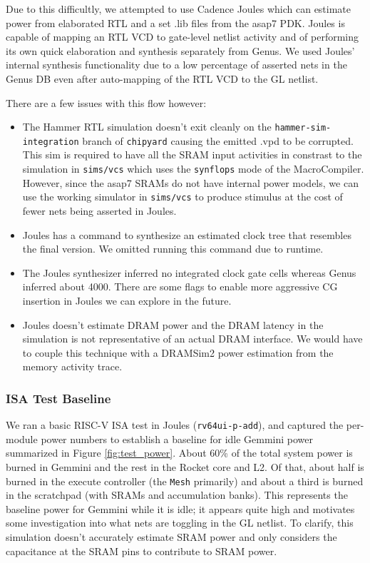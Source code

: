 \documentclass[sigconf]{acmart}
\begin{document}
Due to this difficultly, we attempted to use Cadence Joules which can estimate power from elaborated RTL and a set .lib files from the asap7 PDK.
Joules is capable of mapping an RTL VCD to gate-level netlist activity and of performing its own quick elaboration and synthesis separately from Genus.
We used Joules' internal synthesis functionality due to a low percentage of asserted nets in the Genus DB even after auto-mapping of the RTL VCD to the GL netlist.

There are a few issues with this flow however:
\begin{itemize}
  \item The Hammer RTL simulation doesn't exit cleanly on the \texttt{hammer-sim-integration} branch of \texttt{chipyard} causing the emitted .vpd to be corrupted.
    This sim is required to have all the SRAM input activities in constrast to the simulation in \texttt{sims/vcs} which uses the \texttt{synflops} mode of the MacroCompiler.
    However, since the asap7 SRAMs do not have internal power models, we can use the working simulator in \texttt{sims/vcs} to produce stimulus at the cost of fewer nets being asserted in Joules.
  \item Joules has a command to synthesize an estimated clock tree that resembles the final version. We omitted running this command due to runtime.
  \item The Joules synthesizer inferred no integrated clock gate cells whereas Genus inferred about 4000. There are some flags to enable more aggressive CG insertion in Joules we can explore in the future.
  \item Joules doesn't estimate DRAM power and the DRAM latency in the simulation is not representative of an actual DRAM interface. We would have to couple this technique with a DRAMSim2 power estimation from the memory activity trace.
\end{itemize}

\subsubsection{ISA Test Baseline}
We ran a basic RISC-V ISA test in Joules (\texttt{rv64ui-p-add}), and captured the per-module power numbers to establish a baseline for idle Gemmini power summarized in Figure \ref{fig:test_power}.
About 60\% of the total system power is burned in Gemmini and the rest in the Rocket core and L2.
Of that, about half is burned in the execute controller (the \texttt{Mesh} primarily) and about a third is burned in the scratchpad (with SRAMs and accumulation banks).
This represents the baseline power for Gemmini while it is idle; it appears quite high and motivates some investigation into what nets are toggling in the GL netlist.
To clarify, this simulation doesn't accurately estimate SRAM power and only considers the capacitance at the SRAM pins to contribute to SRAM power.
\end{document}
